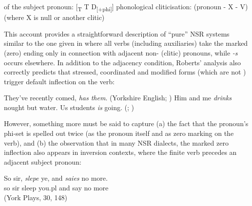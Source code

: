 \documentclass[output=paper]{langsci/langscibook}
\begin{document}
\ea
\ea {} of the subject pronoun: [\textsubscript{T} T D\textsubscript{[+phi]}]
\ex phonological cliticisation: (pronoun - X - V) (where X is null or another clitic)
\z
\z

This account provides a straightforward description of ``pure''
\gls{NSR} systems similar to the one given in
 where all verbs (including auxiliaries) take the
marked (zero) ending only in connection with adjacent non-\Tsg{} (clitic)
pronouns, while \emph{-s} occurs elsewhere. In addition
to the adjacency condition, Roberts' analysis also correctly predicts that
stressed, coordinated and modified forms (which are not ) trigger
default inflection on the verb:

\ea
\ea They've recently comed, \textit{has them}.
(Yorkshire English; \citealt[88]{Pietsch:2005b})
\ex Him and me \textit{drinks} nought but water.
\parencite[6]{Roberts:2010}
\ex Us students \textit{is} going.
(; \citealt[24]{Henry:1995})
\z
\z

However, something more must be said to capture (a) the fact that the pronoun's
phi-set is spelled out twice (as the pronoun itself and as zero marking on the
verb), and (b) the observation that in many \gls{NSR}
dialects, the marked zero inflection also appears in inversion contexts, where
the finite verb precedes an adjacent subject pronoun:

\ea
\gll So sir, \textit{slepe} ye, and \textit{saies} no more.\\
so sir sleep you.pl and say no more\\
\glt (York Plays, 30, 148)
\z
\end{document}
